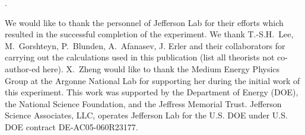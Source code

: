 \documentclass[12pt]{article}
\newcounter{lastnote}
\newenvironment{scilastnote}{%
\setcounter{lastnote}{\value{enumiv}}%
\addtocounter{lastnote}{+1}%
\begin{list}%
{\arabic{lastnote}.}
{\setlength{\leftmargin}{.22in}}
{\setlength{\labelsep}{.5em}}}
{\end{list}}
\begin{document}

%



%
%
%
%
%

%
\begin{thebibliography}{99} 





\end{thebibliography}




\begin{scilastnote}
\item 
We would like to thank the personnel of Jefferson Lab for their efforts which 
resulted in the successful completion of the experiment.
We thank T.-S.H.~Lee, M.~Gorshteyn, P.~Blunden, A.~Afanasev, J. Erler 
and their collaborators for carrying out the calculations used in this publication (list all
theorists not co-author-ed here). 
X.~Zheng would like to thank the Medium Energy Physics Group at the Argonne National 
Lab for supporting her during the initial work of this experiment. 
This work was supported by the Department of Energy (DOE), 
the National Science Foundation,
and the Jeffress Memorial Trust. 
Jefferson Science Associates, LLC,  operates Jefferson Lab for the U.S. DOE under U.S. DOE 
contract DE-AC05-060R23177.
\end{scilastnote}




\end{document}
